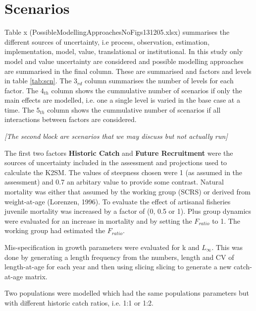 \documentclass[a4paper,10pt]{article}
\begin{document}
\section{Scenarios}

Table x (PossibleModellingApproachesNoFigs131205.xlsx) summarises the different sources of uncertainty, i.e
process, observation, estimation, implementation, model, value, translational or institutional. In this study
only model and value uncertainty are considered and possible modelling approaches are summarised in the final
column. These are summarised and factors and levels in table \ref{tab:scn}. The $3_{rd}$ column summarises the 
number of levels for each factor. The $4_{th}$ column shows the cummulative number of scenarios if only the 
main effects are modelled, i.e. one a single level is varied in the base case at a time. The $5_{th}$ column 
shows the cummulative number of scenarios if all interactions between factors are considered.

\textit{[The second block are scenarios that we may discuss but not actually run]}


The first two factors \textbf{Historic Catch} and \textbf{Future Recruitment} were the sources of uncertainty 
included in the assessment and projections used to calculate the K2SM.
The values of steepness chosen were 1 (as assumed in the assessment) and 0.7 an arbitary value to provide some 
contrast. Natural mortality was either that assumed by the working group (SCRS) or derived from weight-at-age
(Lorenzen, 1996). To evaluate the effect of artisanal fisheries juvenile mortality was increased by a factor of 
(0, 0.5 or 1). Plus group dynamics were evaluated for an increase in mortality and by setting the $F_{ratio}$ to 1.
The working group had estimated the $F_{ratio}$.

Mis-specification in growth parameters were evaluated for k and $L_{\infty}$. This was done by generating a 
length frequency from the numbers, length and CV of length-at-age for each year and then using slicing
slicing to generate a new catch-at-age matrix.

Two populations were modelled which had the same populations parameters but with different historic catch ratios, i.e.
1:1 or 1:2.
\end{document}
